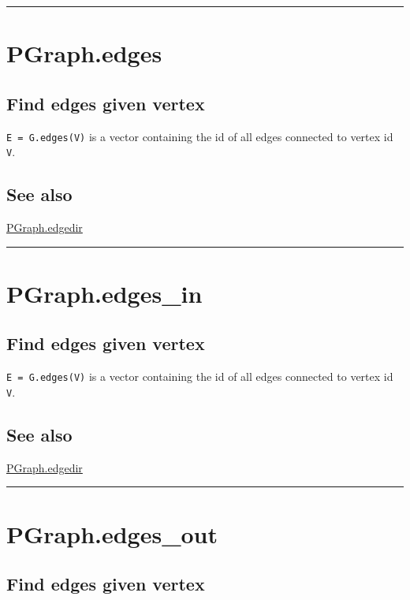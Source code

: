 \vspace{1.5ex}\hrule

\hypertarget{PGraph.edges}{\section*{PGraph.edges}}
\subsection*{Find edges given vertex}


\texttt{E = G.edges(V)} is a vector containing the id of all edges connected to vertex id \texttt{V}.


\subsection*{See also}


\hyperlink{PGraph.edgedir}{\color{blue} PGraph.edgedir}

\vspace{1.5ex}\hrule

\hypertarget{PGraph.edges\_in}{\section*{PGraph.edges\_in}}
\subsection*{Find edges given vertex}


\texttt{E = G.edges(V)} is a vector containing the id of all edges connected to vertex id \texttt{V}.


\subsection*{See also}


\hyperlink{PGraph.edgedir}{\color{blue} PGraph.edgedir}

\vspace{1.5ex}\hrule

\hypertarget{PGraph.edges\_out}{\section*{PGraph.edges\_out}}
\subsection*{Find edges given vertex}


